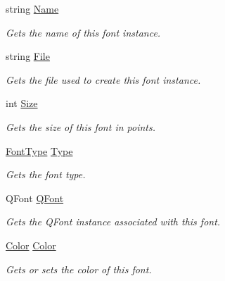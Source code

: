 \begin{DoxyCompactItemize}
\item 
string \hyperlink{class_tri_devs_1_1_tri_engine2_d_1_1_text_1_1_font_af6d31c9d2a35759ce7c2c6432fd34955}{Name}
\begin{DoxyCompactList}\small\item\em Gets the name of this font instance. \end{DoxyCompactList}\item 
string \hyperlink{class_tri_devs_1_1_tri_engine2_d_1_1_text_1_1_font_a9a452edb5662bf9ad60ccb4896417565}{File}
\begin{DoxyCompactList}\small\item\em Gets the file used to create this font instance. \end{DoxyCompactList}\item 
int \hyperlink{class_tri_devs_1_1_tri_engine2_d_1_1_text_1_1_font_a17657517dee9abfa8c1c59c8446b8796}{Size}
\begin{DoxyCompactList}\small\item\em Gets the size of this font in points. \end{DoxyCompactList}\item 
\hyperlink{namespace_tri_devs_1_1_tri_engine2_d_1_1_text_aa624efa98f1dcfec7cddff37f08bbe75}{Font\-Type} \hyperlink{class_tri_devs_1_1_tri_engine2_d_1_1_text_1_1_font_a7903acb278fd03aa45ff8355e0ab0c23}{Type}
\begin{DoxyCompactList}\small\item\em Gets the font type. \end{DoxyCompactList}\item 
Q\-Font \hyperlink{class_tri_devs_1_1_tri_engine2_d_1_1_text_1_1_font_a019de011e935ea9017eb805ff778581a}{Q\-Font}
\begin{DoxyCompactList}\small\item\em Gets the Q\-Font instance associated with this font. \end{DoxyCompactList}\item 
\hyperlink{struct_tri_devs_1_1_tri_engine2_d_1_1_color}{Color} \hyperlink{class_tri_devs_1_1_tri_engine2_d_1_1_text_1_1_font_af320710de94cc455e73a45c67be90c06}{Color}
\begin{DoxyCompactList}\small\item\em Gets or sets the color of this font. \end{DoxyCompactList}\end{DoxyCompactItemize}


